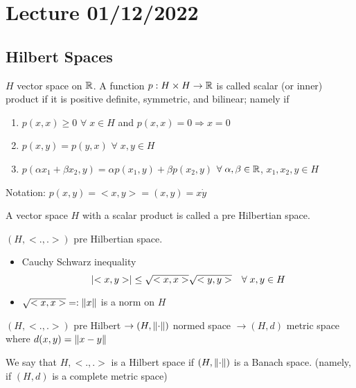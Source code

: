 \section{Lecture 01/12/2022}

\subsection*{Hilbert Spaces}

\begin{definition}
    \(H\) vector space on \(\mathbb{R}\). A function \(p:H \times H \to \mathbb{R}\) is called scalar (or inner) product if it is positive definite, symmetric, and bilinear; namely if 
    \begin{enumerate}
        \item \(p(x, x) \geq 0\) \(\forall \; x \in H\) and \(p(x, x) = 0 \Rightarrow x=0\)
        \item \(p(x, y) = p(y, x)\) \(\forall \; x, y \in H\)
        \item \(p(\alpha x_1 + \beta x_2, y) = \alpha p (x_1, y) + \beta p(x_2, y)\) \(\forall \; \alpha, \beta \in \mathbb{R}\), \(x_1, x_2, y \in H\)
    \end{enumerate}
\end{definition}

Notation: \(p(x, y) = <x, y> = (x, y) = x \dot y\)

\begin{definition}
    A vector space \(H\) with a scalar product is called a pre Hilbertian space.
\end{definition}

\begin{proposition}
    \((H, <.,.>)\) pre Hilbertian space.
    \begin{itemize}
        \item Cauchy Schwarz inequality \[
            \abs{<x, y>} \leq \sqrt{<x, x>} \sqrt{<y, y>} \quad \forall \; x, y \in H
        \]
        \item \(\sqrt{<x, x>} =: \norm{x}\) is a norm on \(H\)
    \end{itemize}
\end{proposition}

\((H, <.,.>)\) pre Hilbert \(\to (H, \norm{\cdot})\) normed space \(\to (H, d)\) metric space where \(d(x, y) = \norm{x-y}\)

\begin{definition}
    We say that \(H, <.,.>\) is a Hilbert space if \((H, \norm{\cdot})\) is a Banach space. (namely, if \((H, d)\) is a complete metric space)
\end{definition}

